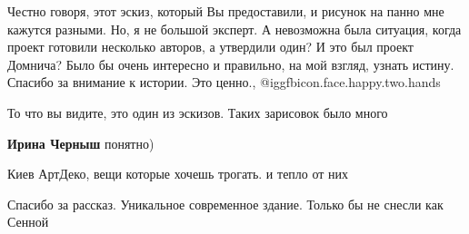 \begin{itemize}
\begin{itemize}

Честно говоря, этот эскиз, который Вы предоставили, и рисунок на панно мне
кажутся разными. Но, я не большой эксперт. А невозможна была ситуация, когда
проект готовили несколько авторов, а утвердили один? И это был проект Домнича?
Было бы очень интересно и правильно, на мой взгляд, узнать истину. Спасибо за
внимание к истории. Это ценно., @igg{fbicon.face.happy.two.hands} 

То что вы видите, это один из эскизов. Таких зарисовок было много

\textbf{Ирина Черныш} понятно)

\end{itemize} %

Киев АртДеко, вещи которые хочешь трогать. и тепло от них

Спасибо за рассказ. Уникальное современное здание. Только бы не снесли как Сенной


\end{itemize} %
